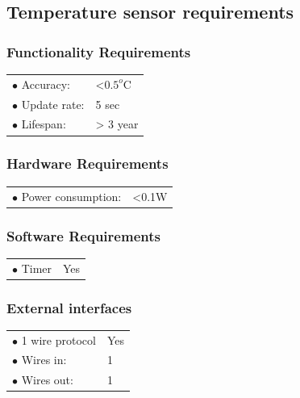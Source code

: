\subsection{Temperature sensor requirements}

\subsubsection{Functionality Requirements}
\begin{table}[H]
\begin{tabular}{p{10cm} p{2cm}}
$\bullet$ Accuracy: & <$0.5^o$C\\
$\bullet$ Update rate: & 5 sec\\
$\bullet$ Lifespan: & > 3 year\\
\end{tabular}
\end{table}

\subsubsection{Hardware Requirements}
\begin{table}[H]
\begin{tabular}{p{10cm} p{2cm}}
$\bullet$ Power consumption: & <0.1W\\


\end{tabular}
\end{table}


\subsubsection{Software Requirements}
\begin{table}[H]
\begin{tabular}{p{10cm} p{2cm}}
$\bullet$ Timer & Yes\\


\end{tabular}
\end{table}


\subsubsection{External interfaces}
\begin{table}[H]
\begin{tabular}{p{10cm} p{2cm}}
$\bullet$ 1 wire protocol & Yes\\
$\bullet$ Wires in: & 1\\
$\bullet$ Wires out: & 1\\
\end{tabular}
\end{table}

